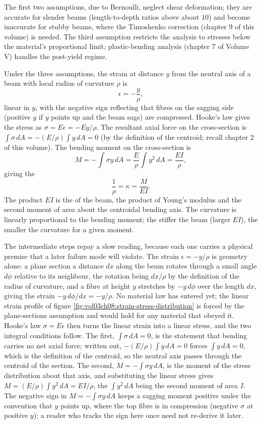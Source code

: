 The first two assumptions, due to Bernoulli, neglect shear
deformation; they are accurate for slender beams (length-to-depth
ratios above about $10$) and become inaccurate for stubby beams,
where the Timoshenko correction (chapter 9 of this volume) is needed.
The third assumption restricts the analysis to stresses below the
material's proportional limit; plastic-bending analysis (chapter 7
of Volume V) handles the post-yield regime.

Under the three assumptions, the strain at distance $y$ from the
neutral axis of a beam with local radius of curvature $\rho$ is
\[
\epsilon = -\frac{y}{\rho},
\]
linear in $y$, with the negative sign reflecting that fibres on the
sagging side (positive $y$ if $y$ points up and the beam sags) are
compressed. Hooke's law gives the stress as $\sigma = E\epsilon =
-Ey/\rho$. The resultant axial force on the cross-section is
$\int \sigma \,dA = -(E/\rho) \int y \,dA = 0$ (by the definition of
the centroid; recall chapter 2 of this volume). The bending moment
on the cross-section is
\[
M = -\int \sigma y \,dA = \frac{E}{\rho}\int y^2 \,dA = \frac{EI}{
\rho},
\]
giving the 
\[
\frac{1}{\rho} = \kappa = \frac{M}{EI}.
\]
The product $EI$ is the  of the beam, the
product of Young's modulus and the second moment of area about the
centroidal bending axis. The curvature is linearly proportional to
the bending moment; the stiffer the beam (larger $EI$), the smaller
the curvature for a given moment.

The intermediate steps repay a slow reading, because each one carries a
physical premise that a later failure mode will violate. The strain
$\epsilon=-y/\rho$ is geometry alone: a plane section a distance $dx$
along the beam rotates through a small angle $d\phi$ relative to its
neighbour, the rotation being $dx/\rho$ by the definition of the radius
of curvature, and a fibre at height $y$ stretches by $-y\,d\phi$ over the
length $dx$, giving the strain $-y\,d\phi/dx=-y/\rho$. No material law has
entered yet; the linear strain profile of figure
\ref{fig:vol03ch08:strain-stress-distribution} is forced by the
plane-sections assumption and would hold for any material that obeyed it.
Hooke's law $\sigma=E\epsilon$ then turns the linear strain into a linear
stress, and the two integral conditions follow. The first,
$\int\sigma\,dA=0$, is the statement that bending carries no net axial
force; written out, $-(E/\rho)\int y\,dA=0$ forces $\int y\,dA=0$, which
is the definition of the centroid, so the neutral axis passes through the
centroid of the section. The second, $M=-\int\sigma y\,dA$, is the moment
of the stress distribution about that axis, and substituting the linear
stress gives $M=(E/\rho)\int y^2\,dA=EI/\rho$, the $\int y^2\,dA$ being
the second moment of area $I$. The negative sign in $M=-\int\sigma y\,dA$
keeps a sagging moment positive under the convention that $y$ points up,
where the top fibre is in compression (negative $\sigma$ at positive
$y$); a reader who tracks the sign here once need not re-derive it later.

